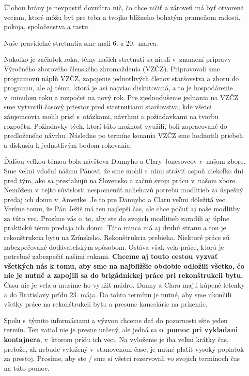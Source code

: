 Úlohou brány je nevpustiť dovnútra nič, čo chce ničiť a zároveň má byť otvorená veciam, ktoré môžu byť pre teba a tvojho blížneho bohatým prameňom radosti, pokoja, spoločenstva a rastu.                



Naše pravidelné stretnutia sme mali 6. a 20.~marca.

Nakoľko je začiatok roka, témy našich stretnutí sa niesli v~znamení prípravy Výročného zborového členského zhromaždenia (VZČZ). Pripravovali sme programovú náplň VZČZ, zapojenie jednotlivých členov staršovstva a zboru do programu, ale aj tému, ktorá je asi najviac diskutovaná, a to je hospodárenie v~minulom roku a rozpočet na nový rok. Pre zjednodušenie jednania na VZČZ sme vytvorili časový priestor pred stretnutiami staršovstva, kde všetci záujemcovia mohli prísť s~otázkami, návrhmi a požiadavkami na tvorbu rozpočtu. Požiadavky tých, ktorí túto možnosť využili, boli zapracované do predloženého návrhu.
Následne po termíne konania VZČZ sme hodnotili priebeh a diskusiu k jednotlivým bodom rokovania.

Ďalšou veľkou témou bola návšteva Dannyho a Clary Jonesovcov v~našom zbore. Sme veľmi vďační nášmu Pánovi, že sme mohli s~nimi stráviť aspoň niekoľko dní pred tým, ako sa presťahujú na Slovensko a začnú svoju prácu v~našom zbore. Nemôžem v~tejto súvislosti nespomenúť naliehavú potrebu modlitieb za úspešný predaj ich domu v~Amerike. Je to pre Dannyho a Claru veľmi dôležitá vec. Veríme tomu, že Pán Ježiš má ten najlepší čas, ale chce počuť aj naše modlitby za túto vec. Prosíme vás o~to, aby ste do svojich modlitieb zaradili aj úplne praktickú tému predaja ich domu.
Táto minca má aj druhú stranu a tou je rekonštrukcia bytu na Zrínskeho. Rekonštrukcia prebieha. Niektoré práce sú zabezpečované dodávateľským spôsobom. Ostáva však veľa práce, ktorú je potrebné zabezpečiť našimi rukami. {\bf Chceme aj touto cestou vyzvať všetkých nás k tomu, aby sme na najbližšie obdobie odložili všetko, čo nie je nutné a zapojili sa do brigádnickej práce pri rekonštrukcii bytu.} Času nie je veľa a musíme ho využiť múdro.
Danny a Clara majú kúpené letenky a do Bratislavy prídu 23. mája. Do tohto termínu je nutné, aby sme ukončili všetky práce na rekonštrukcii bytu a presune kancelárie na prízemie.

Spolu s~týmito informáciami a výzvou chceme dať do pozornosti ešte jeden termín. Ten zatiaľ nie je presne určený, ale jedná sa {\bf o~pomoc pri vykladaní kontajnera}, v~ktorom prídu ich veci. Na vyloženie je iba veľmi krátky čas, pretože, ak nebude vyložený v~stanovenom čase, je nutné platiť vysoký poplatok za prestoj. Prosíme, aby ste / sme si všetci rezervovali vo svojich termínoch čas na túto pomoc.


